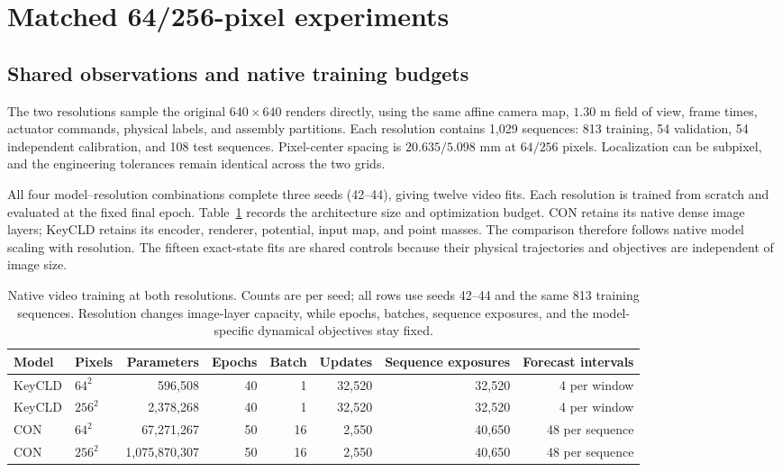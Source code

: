 \section{Matched 64/256-pixel experiments}
\label{app:resolution}
\subsection{Shared observations and native training budgets}
The two resolutions sample the original $640\times640$ renders directly, using the same affine camera map, $1.30$ m field of view, frame times, actuator commands, physical labels, and assembly partitions. Each resolution contains 1,029 sequences: 813 training, 54 validation, 54 independent calibration, and 108 test sequences. Pixel-center spacing is $20.635/5.098$ mm at $64/256$ pixels. Localization can be subpixel, and the engineering tolerances remain identical across the two grids.

All four model--resolution combinations complete three seeds (42--44), giving twelve video fits. Each resolution is trained from scratch and evaluated at the fixed final epoch. Table~\ref{app:resolution-budget} records the architecture size and optimization budget. CON retains its native dense image layers; KeyCLD retains its encoder, renderer, potential, input map, and point masses. The comparison therefore follows native model scaling with resolution. The fifteen exact-state fits are shared controls because their physical trajectories and objectives are independent of image size.

\begin{table}[t]
\caption{Native video training at both resolutions. Counts are per seed; all rows use seeds 42--44 and the same 813 training sequences. Resolution changes image-layer capacity, while epochs, batches, sequence exposures, and the model-specific dynamical objectives stay fixed.}
\label{app:resolution-budget}
\centering\small
\begin{tabular}{llrrrrrr}
\toprule
Model & Pixels & Parameters & Epochs & Batch & Updates & Sequence exposures & Forecast intervals\\
\midrule
KeyCLD & $64^2$ & 596,508 & 40 & 1 & 32,520 & 32,520 & 4 per window\\
KeyCLD & $256^2$ & 2,378,268 & 40 & 1 & 32,520 & 32,520 & 4 per window\\
CON & $64^2$ & 67,271,267 & 50 & 16 & 2,550 & 40,650 & 48 per sequence\\
CON & $256^2$ & 1,075,870,307 & 50 & 16 & 2,550 & 40,650 & 48 per sequence\\
\bottomrule
\end{tabular}
\end{table}

